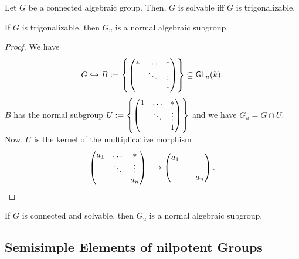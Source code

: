 \begin{corollary}
	Let $G$ be a connected algebraic group. Then, $G$ is solvable iff $G$ is trigonalizable.
\end{corollary}

\begin{proposition}
	If $G$ is trigonalizable, then $G_u$ is a normal algebraic subgroup.
\end{proposition}
\begin{proof}
	We have
	\[ G \overset{}{\hookrightarrow} B:= \left\lbrace
\left(\begin{matrix} * & \ldots & *\\  & \ddots & \vdots \\ & & * \end{matrix}\right)	
\right\rbrace  \subseteq \textsf{GL}_n(k). \]
$B$ has the normal subgroup $U := \left\lbrace
	\left(\begin{matrix} 1 & \ldots & *\\  & \ddots & \vdots \\ & & 1 \end{matrix}\right)	
\right\rbrace$ and we have $G_u = G \cap U$. Now, $U$ is the kernel of the multiplicative morphism
\[ 
\left(\begin{matrix} a_1 & \ldots & * \\ & \ddots & \vdots \\ & & a_n \end{matrix}\right) \longmapsto \left(\begin{matrix} a_1 &  &  \\ &  &  \\ & & a_n \end{matrix}\right).
\]
\end{proof}
\begin{corollary}
	If $G$ is connected and solvable, then $G_u$ is a normal algebraic subgroup.
\end{corollary}

\subsection{Semisimple Elements of nilpotent Groups}

